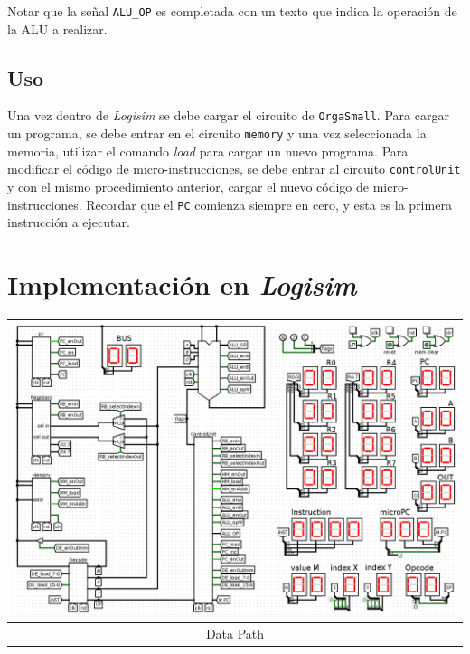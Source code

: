 \documentclass[a4paper,11pt]{article}
\begin{document}
\noindent Notar que la señal \verb|ALU_OP| es completada con un texto que indica la operación de la ALU a realizar.

\subsection*{Uso}

Una vez dentro de \emph{Logisim} se debe cargar el circuito de \texttt{OrgaSmall}.
Para cargar un programa, se debe entrar en el circuito \texttt{memory} y una vez seleccionada la memoria, utilizar el comando \emph{load} para cargar un nuevo programa.
Para modificar el código de micro-instrucciones, se debe entrar al circuito \texttt{controlUnit} y con el mismo procedimiento anterior, cargar el nuevo código de micro-instrucciones.
Recordar que el \texttt{PC} comienza siempre en cero, y esta es la primera instrucción a ejecutar.

\vspace{1cm}

\section*{Implementación en \emph{Logisim}}

\vspace{0.5cm}

\begin{center}
 \begin{tabular}[t]{c}
\includegraphics[scale=0.3]{img/0_dataPath.png} \\
\hline
Data Path \\ \hline
\end{tabular}
\end{center}
\end{document}
